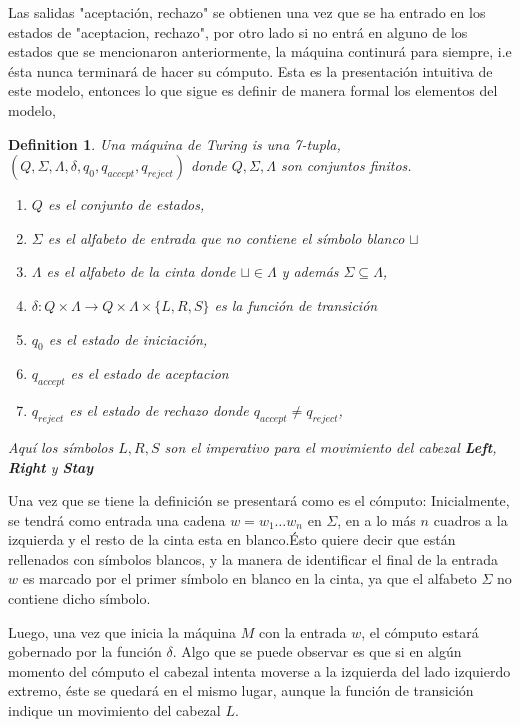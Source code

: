 \documentclass[10pt]{report}
\newtheorem{definition}{Definition}
\begin{document}
    Las salidas "aceptación, rechazo" se obtienen una vez que se ha entrado en los estados de "aceptacion, rechazo",
    por otro lado si no entrá en alguno de los estados que se mencionaron anteriormente, la máquina continurá para siempre, i.e
    ésta nunca terminará de hacer su cómputo.\space
    Esta es la presentación intuitiva de este modelo, entonces lo que sigue es definir de manera formal los elementos del modelo,


    \begin{definition}%
        Una máquina de Turing is una 7-tupla, $(Q,\Sigma,\Lambda,\delta,q_{0},q_{accept},q_{reject})$
        donde $Q,\Sigma,\Lambda$ son conjuntos finitos.
        \begin{enumerate}
            \item $Q$ es el conjunto de estados,
            \item $\Sigma$ es el alfabeto de entrada que no contiene el símbolo blanco $\sqcup$
            \item $\Lambda$ es el alfabeto de la cinta donde  $\sqcup\in\Lambda$ y además $\Sigma\subseteq\Lambda$,
            \item $\delta: Q\times\Lambda \rightarrow Q\times\Lambda\times\{L,R,S\}$ es la función de transición
            \item $q_{0}$ es el estado de iniciación,
            \item $q_{accept}$ es el estado de aceptacion
            \item $q_{reject}$ es el estado de rechazo donde $q_{accept} \neq q_{reject}$,

        \end{enumerate}
        Aquí los símbolos $L,R,S$ son el imperativo para el movimiento del cabezal \textbf{Left}, \textbf{Right} y \textbf{Stay}
    \end{definition}
    Una vez que se tiene la definición se presentará como es el cómputo:\newline
    Inicialmente, se tendrá como entrada una cadena $w = w_{1}\dots w_{n}$ en $\Sigma$, en a lo más $n$ cuadros
    a la izquierda y el resto de la cinta esta en blanco.Ésto quiere decir que están rellenados con símbolos blancos,
    y la manera de identificar el final de la entrada $w$ es marcado por el primer símbolo en blanco en la cinta,
    ya que el alfabeto $\Sigma$ no contiene dicho símbolo.
    \space

    Luego, una vez que inicia la máquina $M$ con la entrada $w$, el cómputo estará gobernado por la función $\delta$.
    Algo que se puede observar es que si en algún momento del cómputo el cabezal intenta moverse a la izquierda del lado
    izquierdo extremo, éste se quedará en el mismo lugar, aunque la función de transición indique un movimiento del cabezal $L$.
\end{document}
